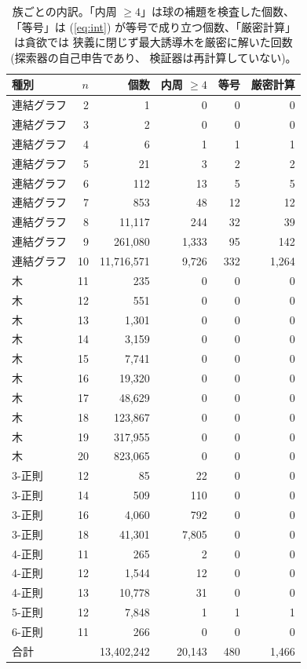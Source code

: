 \documentclass[paper=a4,fontsize=10.5pt,jafontsize=10.5pt]{jlreq}
\theoremstyle{plain}
\theoremstyle{definition}
\begin{document}
\begin{table}[htbp]
\centering
\caption{族ごとの内訳。「内周 $\ge 4$」は球の補題を検査した個数、
「等号」は (\ref{eq:int}) が等号で成り立つ個数、「厳密計算」は貪欲では
狭義に閉じず最大誘導木を厳密に解いた回数 (探索器の自己申告であり、
検証器は再計算していない)。}\label{tab:fams}
\begin{tabular}{lrrrrr}
\toprule
種別 & $n$ & 個数 & 内周 $\ge 4$ & 等号 & 厳密計算 \\
\midrule
連結グラフ & 2 & 1 & 0 & 0 & 0 \\
連結グラフ & 3 & 2 & 0 & 0 & 0 \\
連結グラフ & 4 & 6 & 1 & 1 & 1 \\
連結グラフ & 5 & 21 & 3 & 2 & 2 \\
連結グラフ & 6 & 112 & 13 & 5 & 5 \\
連結グラフ & 7 & 853 & 48 & 12 & 12 \\
連結グラフ & 8 & 11,117 & 244 & 32 & 39 \\
連結グラフ & 9 & 261,080 & 1,333 & 95 & 142 \\
連結グラフ & 10 & 11,716,571 & 9,726 & 332 & 1,264 \\
木 & 11 & 235 & 0 & 0 & 0 \\
木 & 12 & 551 & 0 & 0 & 0 \\
木 & 13 & 1,301 & 0 & 0 & 0 \\
木 & 14 & 3,159 & 0 & 0 & 0 \\
木 & 15 & 7,741 & 0 & 0 & 0 \\
木 & 16 & 19,320 & 0 & 0 & 0 \\
木 & 17 & 48,629 & 0 & 0 & 0 \\
木 & 18 & 123,867 & 0 & 0 & 0 \\
木 & 19 & 317,955 & 0 & 0 & 0 \\
木 & 20 & 823,065 & 0 & 0 & 0 \\
3-正則 & 12 & 85 & 22 & 0 & 0 \\
3-正則 & 14 & 509 & 110 & 0 & 0 \\
3-正則 & 16 & 4,060 & 792 & 0 & 0 \\
3-正則 & 18 & 41,301 & 7,805 & 0 & 0 \\
4-正則 & 11 & 265 & 2 & 0 & 0 \\
4-正則 & 12 & 1,544 & 12 & 0 & 0 \\
4-正則 & 13 & 10,778 & 31 & 0 & 0 \\
5-正則 & 12 & 7,848 & 1 & 1 & 1 \\
6-正則 & 11 & 266 & 0 & 0 & 0 \\
\midrule
合計 & & 13,402,242 & 20,143 & 480 & 1,466 \\
\bottomrule
\end{tabular}
\end{table}
\end{document}
